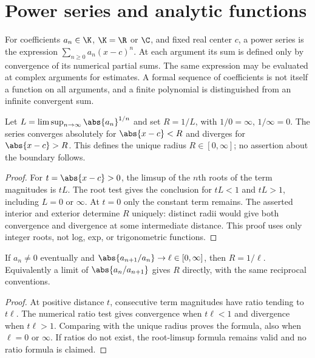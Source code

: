 \chapter{Power series and analytic functions}

\begin{definition}
For coefficients $a_n\in\K$, $\K=\R$ or $\C$, and fixed real center $c$, a power series is the expression $\sum_{n\geq0}a_n(x-c)^n$. At each argument its sum is defined only by convergence of its numerical partial sums. The same expression may be evaluated at complex arguments for estimates. A formal sequence of coefficients is not itself a function on all arguments, and a finite polynomial is distinguished from an infinite convergent sum.
\end{definition}

\begin{theorem}
Let $L=\limsup_{n\to\infty}\abs{a_n}^{1/n}$ and set $R=1/L$, with $1/0=\infty$, $1/\infty=0$. The series converges absolutely for $\abs{x-c}<R$ and diverges for $\abs{x-c}>R$. This defines the unique radius $R\in[0,\infty]$; no assertion about the boundary follows.
\end{theorem}
\begin{proof}
For $t=\abs{x-c}>0$, the limsup of the $n$th roots of the term magnitudes is $tL$. The root test  gives the conclusion for $tL<1$ and $tL>1$, including $L=0$ or $\infty$. At $t=0$ only the constant term remains. The asserted interior and exterior determine $R$ uniquely: distinct radii would give both convergence and divergence at some intermediate distance. This proof uses only integer roots, not log, exp, or trigonometric functions.
\end{proof}

\begin{theorem}
If $a_n\ne0$ eventually and $\abs{a_{n+1}/a_n}\to\ell\in[0,\infty]$, then $R=1/\ell$. Equivalently a limit of $\abs{a_n/a_{n+1}}$ gives $R$ directly, with the same reciprocal conventions.
\end{theorem}
\begin{proof}
At positive distance $t$, consecutive term magnitudes have ratio tending to $t\ell$. The numerical ratio test gives convergence when $t\ell<1$ and divergence when $t\ell>1$. Comparing with the unique radius proves the formula, also when $\ell=0$ or $\infty$. If ratios do not exist, the root-limsup formula remains valid and no ratio formula is claimed.
\end{proof}

